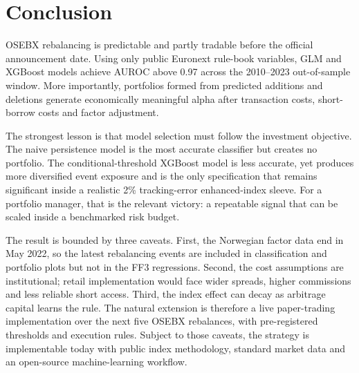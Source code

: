 \section{Conclusion}
\label{sec:conc}

OSEBX rebalancing is predictable and partly tradable before the official announcement date. Using only public Euronext rule-book variables, GLM and XGBoost models achieve AUROC above 0.97 across the 2010--2023 out-of-sample window. More importantly, portfolios formed from predicted additions and deletions generate economically meaningful alpha after transaction costs, short-borrow costs and factor adjustment.

The strongest lesson is that model selection must follow the investment objective. The naive persistence model is the most accurate classifier but creates no portfolio. The conditional-threshold XGBoost model is less accurate, yet produces more diversified event exposure and is the only specification that remains significant inside a realistic 2\% tracking-error enhanced-index sleeve. For a portfolio manager, that is the relevant victory: a repeatable signal that can be scaled inside a benchmarked risk budget.

The result is bounded by three caveats. First, the Norwegian factor data end in May 2022, so the latest rebalancing events are included in classification and portfolio plots but not in the FF3 regressions. Second, the cost assumptions are institutional; retail implementation would face wider spreads, higher commissions and less reliable short access. Third, the index effect can decay as arbitrage capital learns the rule. The natural extension is therefore a live paper-trading implementation over the next five OSEBX rebalances, with pre-registered thresholds and execution rules. Subject to those caveats, the strategy is implementable today with public index methodology, standard market data and an open-source machine-learning workflow.
